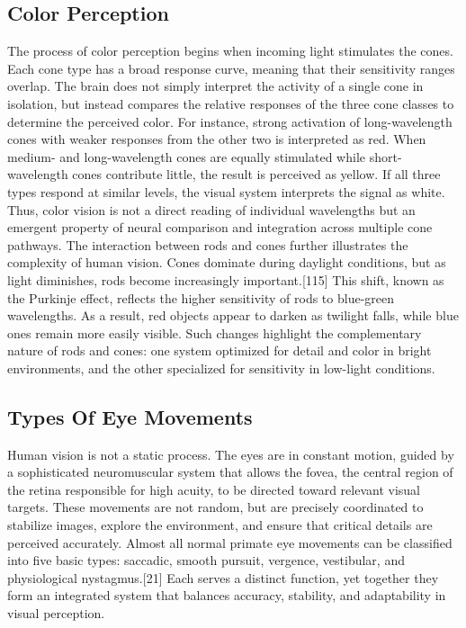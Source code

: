 \documentclass[12pt]{report}
\begin{document}
\subsection{Color Perception}

The process of color perception begins when incoming light stimulates the cones.
Each cone type has a broad response curve, meaning that their sensitivity ranges overlap. 
The brain does not simply interpret the activity of a single cone in isolation, but instead compares the relative responses of the three cone classes to determine the perceived color. 
For instance, strong activation of long-wavelength cones with weaker responses from the other two is interpreted as red. 
When medium- and long-wavelength cones are equally stimulated while short-wavelength cones contribute little, the result is perceived as yellow. 
If all three types respond at similar levels, the visual system interprets the signal as white. 
Thus, color vision is not a direct reading of individual wavelengths but an emergent property of neural comparison and integration across multiple cone pathways.
The interaction between rods and cones further illustrates the complexity of human vision.
Cones dominate during daylight conditions, but as light diminishes, rods become increasingly important.[115]
This shift, known as the Purkinje effect, reflects the higher sensitivity of rods to blue-green wavelengths.
As a result, red objects appear to darken as twilight falls, while blue ones remain more easily visible. 
Such changes highlight the complementary nature of rods and cones: one system optimized for detail and color in bright environments, and the other specialized for sensitivity in low-light conditions.

\subsection{Types Of Eye Movements}

Human vision is not a static process. 
The eyes are in constant motion, guided by a sophisticated neuromuscular system that allows the fovea, the central region of the retina responsible for high acuity, to be directed toward relevant visual targets.
These movements are not random, but are precisely coordinated to stabilize images, explore the environment, and ensure that critical details are perceived accurately.
Almost all normal primate eye movements can be classified into five basic types: saccadic, smooth pursuit, vergence, vestibular, and physiological nystagmus.[21]
Each serves a distinct function, yet together they form an integrated system that balances accuracy, stability, and adaptability in visual perception.
\end{document}
